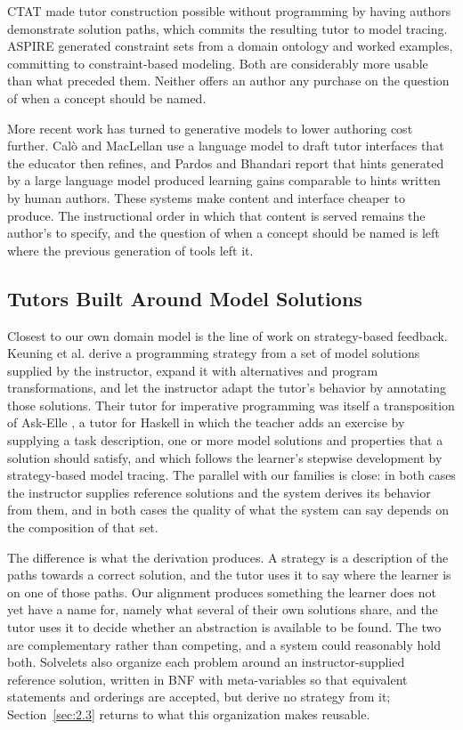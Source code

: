 \documentclass[journal]{IEEEtran}
\begin{document}
CTAT \cite{b4} made tutor construction possible without programming by
having authors demonstrate solution paths, which commits the resulting
tutor to model tracing. ASPIRE \cite{b5} generated constraint sets from a
domain ontology and worked examples, committing to constraint-based
modeling. Both are considerably more usable than what preceded them.
Neither offers an author any purchase on the question of when a concept
should be named.

More recent work has turned to generative models to lower authoring cost further. Calò and MacLellan \cite{b8} use a language model to draft tutor interfaces that the educator then refines, and Pardos and Bhandari \cite{b9} report that hints generated by a large language model produced learning gains comparable to hints written by human authors. These systems make content and interface cheaper to produce. The instructional order in which that content is served remains the author's to specify, and the question of when a concept should be named is left where the previous generation of tools left it.

\subsection{Tutors Built Around Model Solutions}\label{sec:2.2}
Closest to our own domain model is the line of work on strategy-based
feedback. Keuning et al. \cite{b10} derive a programming strategy from a set of
model solutions supplied by the instructor, expand it with alternatives and
program transformations, and let the instructor adapt the tutor's behavior by
annotating those solutions. Their tutor for imperative programming was itself a transposition of Ask-Elle \cite{b11}, a tutor for Haskell in which the teacher adds an exercise by supplying a task description, one or more model solutions and properties that a solution should satisfy, and which follows the learner's stepwise development by strategy-based model tracing. The parallel with
our families is close: in both cases the instructor supplies reference solutions
and the system derives its behavior from them, and in both cases the quality of
what the system can say depends on the composition of that set. 

The difference is what the derivation produces. A strategy is a description of
the paths towards a correct solution, and the tutor uses it to say where the
learner is on one of those paths. Our alignment produces something the learner
does not yet have a name for, namely what several of their own solutions share,
and the tutor uses it to decide whether an abstraction is available to be found.
The two are complementary rather than competing, and a system could reasonably
hold both. 
Solvelets \cite{b12} also organize each problem around an instructor-supplied reference solution, written in BNF with meta-variables so that equivalent statements and orderings are accepted, but derive no strategy from it; Section~\ref{sec:2.3} returns to what this organization makes reusable.
\end{document}
